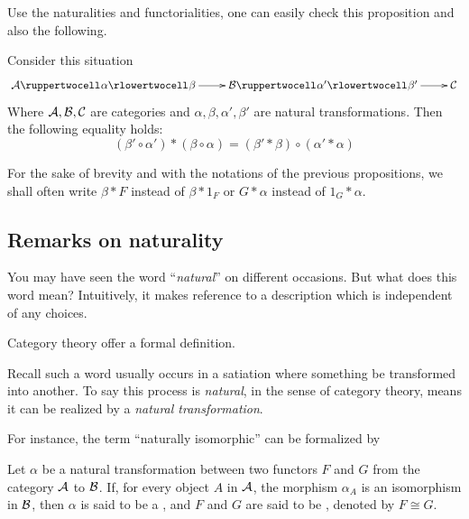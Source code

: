   Use the naturalities and functorialities, one can easily check this proposition and also the following.

  \begin{prop}
  Consider this situation
      \begin{displaymath}
        \xymatrix{
          \Aa \ruppertwocell^{}_{}{\alpha} \rlowertwocell^{}_{}{\beta} \ar[r]
          & \Bb\ruppertwocell^{}_{}{\alpha'} \rlowertwocell^{}_{}{\beta'} \ar[r]
          & \Cc
        }
      \end{displaymath}
    Where ${\cal A},{\cal B},{\cal C}$ are categories and $\alpha,\beta, \alpha', \beta'$ are natural transformations. Then the following equality holds:
    \begin{equation*}
      (\beta'\circ\alpha')\ast(\beta\circ\alpha) = (\beta'\ast\beta)\circ(\alpha'\ast\alpha)
    \end{equation*}
  \end{prop}

  For the sake of brevity and with the notations of the previous propositions, we shall often write $\beta\ast F$ instead of $\beta\ast1_{F}$ or $G\ast\alpha$ instead of $1_{G}\ast\alpha$.

\subsection{Remarks on naturality}
  You may have seen the word ``\emph{natural}'' on different occasions. But what does this word mean? Intuitively, it makes reference to a description which is independent of any choices.

  Category theory offer a formal definition.

  Recall such a word usually occurs in a satiation where something be transformed into another. To say this process is \emph{natural}, in the sense of category theory, means it can be realized by a \emph{natural transformation}.

  For instance, the term ``naturally isomorphic'' can be formalized by
  \begin{defn}
    Let $\alpha$ be a natural transformation between two functors $F$ and $G$ from the category ${\cal A}$ to ${\cal B}$.
    If, for every object $A$ in ${\cal A}$, the morphism $\alpha_A$ is an isomorphism in ${\cal B}$, then $\alpha$ is said to be a
    , and $F$ and $G$ are said to be , denoted by $F\cong G$.
  \end{defn}


